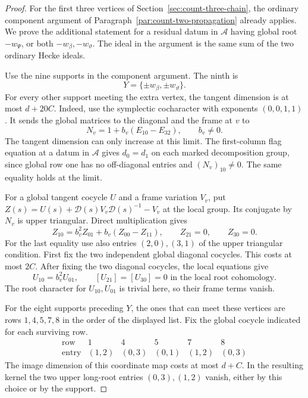 \begin{proof}
For the first three vertices of
Section~\ref{sec:count-three-chain}, the ordinary
component argument of Paragraph~\ref{par:count-two-propagation}
already applies. We prove the additional statement
for a residual datum in \(\mathcal A\) having global root
\(-w_\Psi\), or both \(-w_\beta,-w_\vartheta\).
The ideal in the argument is the same sum of the two
ordinary Hecke ideals.

Use the nine supports in the component argument.
The ninth is
\[
                   Y=\{\pm w_\beta,\pm w_\vartheta\}.
\]
For every other support meeting the extra vertex, the
tangent dimension is at most \(d+20C\).
Indeed, use the symplectic cocharacter with exponents
\((0,0,1,1)\). It sends the global matrices to the
diagonal and the frame at \(v\) to
\[
                     N_v=1+b_v(E_{10}-E_{32}),
                     \qquad b_v\ne0.
\]
The tangent dimension can only increase at this
limit. The first-column flag equation at a datum in
\(\mathcal A\) gives \(d_0=d_1\) on each marked
decomposition group, since global row one has no
off-diagonal entries and \((N_v)_{10}\ne0\).
The same equality holds at the limit.

For a global tangent cocycle \(U\) and a frame
variation \(V_v\), put
\(Z(s)=U(s)+\mathcal D(s)V_v\mathcal D(s)^{-1}-V_v\)
at the local group. Its conjugate by \(N_v\) is
upper triangular. Direct multiplication gives
\[
 Z_{10}=b_v^2 Z_{01}+b_v(Z_{00}-Z_{11}),\qquad
 Z_{21}=0,\qquad Z_{30}=0 .
\]
For the last equality use also entries \((2,0),(3,1)\)
of the upper triangular condition.
First fix the two independent global diagonal
cocycles. This costs at most \(2C\).
After fixing the two diagonal cocycles, the local equations give
\[
       U_{10}=b_v^2U_{01},\qquad [U_{21}]=[U_{30}]=0
         \text{ in the local root cohomology}.
\]
The root character for \(U_{10},U_{01}\) is trivial here,
so their frame terms vanish.

For the eight supports preceding \(Y\), the ones
that can meet these vertices are rows \(1,4,5,7,8\)
in the order of the displayed list.
Fix the global cocycle indicated for each surviving row.
\[
 \begin{array}{c|ccccc}
 \text{row}&1&4&5&7&8\\\hline
 \text{entry}&(1,2)&(0,3)&(0,1)&(1,2)&(0,3)
 \end{array}
\]
The image dimension of this coordinate map costs at most \(d+C\).
In the resulting kernel the two upper long-root
entries \((0,3),(1,2)\) vanish, either by this choice
or by the support.


\end{proof}
